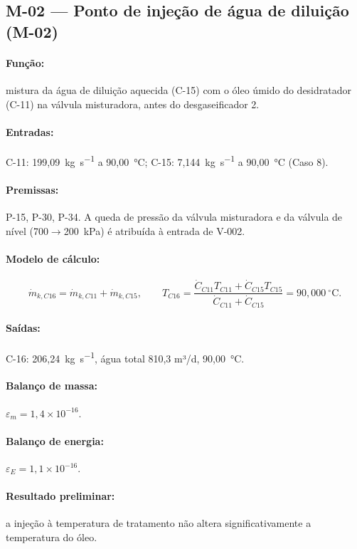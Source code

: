 \documentclass[11pt,a4paper]{article}
\numberwithin{equation}{section}
\numberwithin{table}{section}
\numberwithin{figure}{section}
\begin{document}
\subsection{M-02 --- Ponto de injeção de água de diluição (M-02)}
\paragraph{Função:} mistura da água de diluição aquecida (C-15) com o óleo úmido do desidratador (C-11) na válvula misturadora, antes do desgaseificador 2.
\paragraph{Entradas:} C-11: 199,09~\si{\kilogram\per\second} a 90,00~\si{\celsius}; C-15: 7,144~\si{\kilogram\per\second} a 90,00~\si{\celsius} (Caso 8).
\paragraph{Premissas:} P-15, P-30, P-34. A queda de pressão da válvula misturadora e da válvula de nível (700$\to$200~\si{\kilo\pascal}) é atribuída à entrada de V-002.
\paragraph{Modelo de cálculo:}
\begin{equation}
\dot m_{k,C16}=\dot m_{k,C11}+\dot m_{k,C15},\qquad T_{C16}=\frac{\dot C_{C11}T_{C11}+\dot C_{C15}T_{C15}}{\dot C_{C11}+\dot C_{C15}}=90{,}000\ ^\circ\mathrm{C}.
\end{equation}
\paragraph{Saídas:} C-16: 206,24~\si{\kilogram\per\second}, água total 810,3 m³/d, 90,00~\si{\celsius}.
\paragraph{Balanço de massa:} $\varepsilon_m=$$1{,}4\times10^{-16}$.
\paragraph{Balanço de energia:} $\varepsilon_E=$$1{,}1\times10^{-16}$.
\paragraph{Resultado preliminar:} a injeção à temperatura de tratamento não altera significativamente a temperatura do óleo.
\end{document}
